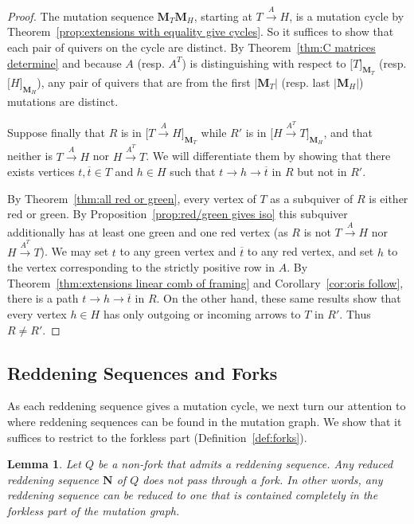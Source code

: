 \documentclass[11pt, letterpaper]{amsart}
\newtheorem{lemma}[theorem]{Lemma}
\theoremstyle{definition}
\numberwithin{equation}{section}
\begin{document}
\begin{proof}
The mutation sequence $\mathbf{M}_T\mathbf{M}_H$, starting at $T \stackrel{A}{\rightarrow} H$, is a mutation cycle by Theorem~\ref{prop:extensions with equality give cycles}.
So it suffices to show that each pair of quivers on the cycle are distinct.
By Theorem~\ref{thm:C matrices determine} and because $A$ (resp. $A^T$) is distinguishing with respect to $\big [T\big ]_{\mathbf{M}_T}$ (resp. $\big [H\big ]_{\mathbf{M}_H}$), any pair of quivers that are from the first $|\mathbf M_T|$ (resp. last $|\mathbf M_H|$) mutations are distinct.

Suppose finally that $R$ is in $\big [T \stackrel{A}{\rightarrow} H\big ]_{\mathbf{M}_T}$ while $R'$ is in $\big [H \stackrel{A^T}{\rightarrow} T\big ]_{\mathbf{M}_H}$, and that neither is $T \stackrel{A}{\rightarrow} H$ nor $H \stackrel{A^T}{\rightarrow} T$. 
We will differentiate them by showing that there exists vertices $t, \overline t \in T$ and $h \in H$ such that $t \rightarrow h \rightarrow \overline t$ in $R$ but not in $R'$.

By Theorem~\ref{thm:all red or green}, every vertex of $T$ as a subquiver of $R$ is either red or green. 
By Proposition~\ref{prop:red/green gives iso} this subquiver additionally has at least one green and one red vertex (as $R$ is not $T \stackrel{A}{\rightarrow} H$ nor $H \stackrel{A^T}{\rightarrow} T$).
We may set $t$ to any green vertex and $\overline t$ to any red vertex, and set $h$ to the vertex corresponding to the strictly positive row in $A$. 
By Theorem~\ref{thm:extensions linear comb of framing} and Corollary~\ref{cor:oris follow}, there is a path $t \rightarrow h \rightarrow \overline t$ in $R$.
On the other hand, these same results show that every vertex $h \in H$ has only outgoing or incoming arrows to $T$ in $R'$. 
Thus $R \neq R'$.
\end{proof}


\subsection{Reddening Sequences and Forks} \label{subsec:reddening-forks}

As each reddening sequence gives a mutation cycle, we next turn our attention to where reddening sequences can be found in the mutation graph. 
We show that it suffices to restrict to the forkless part (Definition~\ref{def:forks}).

\begin{lemma} \label{lem:reddening forkless part}
    Let $Q$ be a non-fork that admits a reddening sequence.
    Any reduced reddening sequence $\mathbf{N}$ of $Q$ does not pass through a fork.
    In other words, any reddening sequence can be reduced to one that is contained completely in the forkless part of the mutation graph.
\end{lemma}
\end{document}
